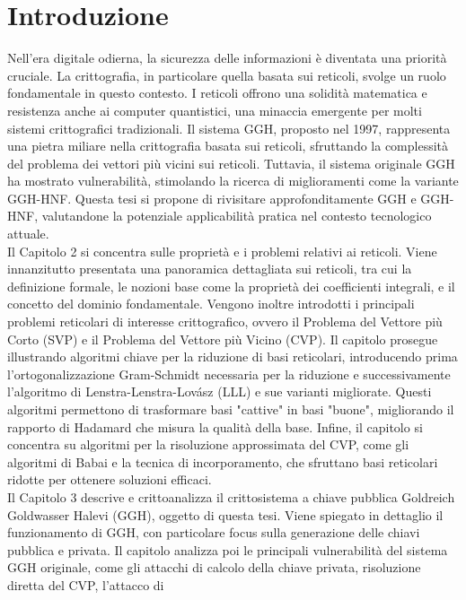 \chapter{Introduzione}
\label{cap1}

Nell'era digitale odierna, la sicurezza delle informazioni è diventata una priorità 
cruciale. La crittografia, in particolare quella basata sui reticoli, svolge un ruolo 
fondamentale in questo contesto. I reticoli offrono una solidità matematica e resistenza 
anche ai computer quantistici, una minaccia emergente per molti sistemi crittografici 
tradizionali.
Il sistema GGH, proposto nel 1997, rappresenta una pietra miliare nella crittografia 
basata sui reticoli, sfruttando la complessità del problema dei vettori più vicini sui reticoli. Tuttavia, il sistema originale GGH ha mostrato vulnerabilità, stimolando la ricerca di miglioramenti come la variante GGH-HNF.
Questa tesi si propone di rivisitare approfonditamente GGH e GGH-HNF, valutandone la 
potenziale applicabilità pratica nel contesto tecnologico attuale. \\
Il Capitolo 2 si concentra sulle proprietà e i problemi relativi ai reticoli. 
Viene innanzitutto presentata una panoramica dettagliata sui reticoli, tra cui la 
definizione formale, le nozioni base come la proprietà dei coefficienti integrali, e il 
concetto del dominio fondamentale. Vengono inoltre introdotti i principali problemi 
reticolari di interesse crittografico, ovvero il Problema del Vettore più Corto (SVP) e 
il Problema del Vettore più Vicino (CVP). Il capitolo prosegue illustrando algoritmi 
chiave per la riduzione di basi reticolari, introducendo prima l'ortogonalizzazione
Gram-Schmidt necessaria per la riduzione e successivamente l'algoritmo di Lenstra-Lenstra-Lovász 
(LLL) e sue varianti migliorate. Questi algoritmi permettono di trasformare 
basi "cattive" in basi "buone", migliorando il rapporto di Hadamard che misura la qualità 
della base.
Infine, il capitolo si concentra su algoritmi per la risoluzione approssimata del CVP, 
come gli algoritmi di Babai e la tecnica di incorporamento, che sfruttano basi reticolari 
ridotte per ottenere soluzioni efficaci. \\
Il Capitolo 3 descrive e crittoanalizza il crittosistema a chiave pubblica Goldreich 
Goldwasser Halevi (GGH), oggetto di questa tesi. Viene spiegato in dettaglio il funzionamento 
di GGH, con particolare focus sulla generazione delle chiavi pubblica e privata. 
Il capitolo analizza poi le principali vulnerabilità del sistema GGH originale, come 
gli attacchi di calcolo della chiave privata, risoluzione diretta del CVP, l'attacco di 
